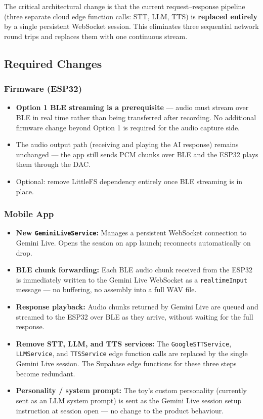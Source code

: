 \documentclass[12pt,a4paper]{article}
\begin{document}
The critical architectural change is that the current request--response pipeline (three separate
cloud edge function calls: STT, LLM, TTS) is \textbf{replaced entirely} by a single persistent
WebSocket session. This eliminates three sequential network round trips and replaces them with
one continuous stream.

\subsection{Required Changes}

\subsubsection{Firmware (ESP32)}

\begin{itemize}
  \item \textbf{Option 1 BLE streaming is a prerequisite} — audio must stream over BLE in
        real time rather than being transferred after recording. No additional firmware change
        beyond Option 1 is required for the audio capture side.
  \item The audio output path (receiving and playing the AI response) remains unchanged —
        the app still sends PCM chunks over BLE and the ESP32 plays them through the DAC.
  \item Optional: remove LittleFS dependency entirely once BLE streaming is in place.
\end{itemize}

\subsubsection{Mobile App}

\begin{itemize}
  \item \textbf{New \texttt{GeminiLiveService}:} Manages a persistent WebSocket connection to
        Gemini Live. Opens the session on app launch; reconnects automatically on drop.
  \item \textbf{BLE chunk forwarding:} Each BLE audio chunk received from the ESP32 is
        immediately written to the Gemini Live WebSocket as a \texttt{realtimeInput} message
        — no buffering, no assembly into a full WAV file.
  \item \textbf{Response playback:} Audio chunks returned by Gemini Live are queued and
        streamed to the ESP32 over BLE as they arrive, without waiting for the full response.
  \item \textbf{Remove STT, LLM, and TTS services:} The \texttt{GoogleSTTService},
        \texttt{LLMService}, and \texttt{TTSService} edge function calls are replaced by the
        single Gemini Live session. The Supabase edge functions for these three steps become
        redundant.
  \item \textbf{Personality / system prompt:} The toy's custom personality (currently sent as
        an LLM system prompt) is sent as the Gemini Live session setup instruction at session
        open — no change to the product behaviour.
\end{itemize}
\end{document}
